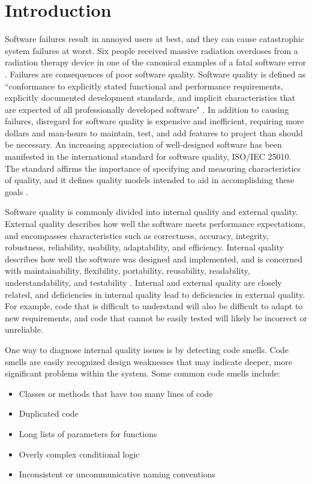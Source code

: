 \documentclass{sig-alternate}
\begin{document}
\section{Introduction}
\label{sec:intro}
Software failures result in annoyed users at best, and they can cause catastrophic system failures at worst. Six people received massive radiation overdoses from a radiation therapy device in one of the canonical examples of a fatal software error \cite{leveson1995therac}. Failures are consequences of poor software quality. Software quality is defined as ``conformance to explicitly stated functional and performance requirements, explicitly documented development standards, and implicit characteristics that are expected of all professionally developed software" \cite{pressman1997}. In addition to causing failures, disregard for software quality is expensive and inefficient, requiring more dollars and man-hours to maintain, test, and add features to project than should be necessary. An increasing appreciation of well-designed software has been manifested in the international standard for software quality, ISO/IEC 25010. The standard affirms the importance of specifying and measuring characteristics of quality, and it defines quality models intended to aid in accomplishing these goals \cite{iso2011iec}.

Software quality is commonly divided into internal quality and external quality. External quality describes how well the software meets performance expectations, and encompasses characteristics such as correctness, accuracy, integrity, robustness, reliability, usability, adaptability, and efficiency. Internal quality describes how well the software was designed and implemented, and is concerned with maintainability, flexibility, portability, reusability, readability, understandability, and testability \cite{mcconnell1993codecomplete}. Internal and external quality are closely related, and deficiencies in internal quality lead to deficiencies in external quality. For example, code that is difficult to understand will also be difficult to adapt to new requirements, and code that cannot be easily tested will likely be incorrect or unreliable. 



One way to diagnose internal quality issues is by detecting code smells. Code smells are easily recognized design weaknesses that may indicate deeper, more significant problems within the system. Some common code smells include:
\begin{itemize}
\item Classes or methods that have too many lines of code
\item Duplicated code
\item Long lists of parameters for functions
\item Overly complex conditional logic
\item Inconsistent or uncommunicative naming conventions
\end{itemize}
\end{document}
